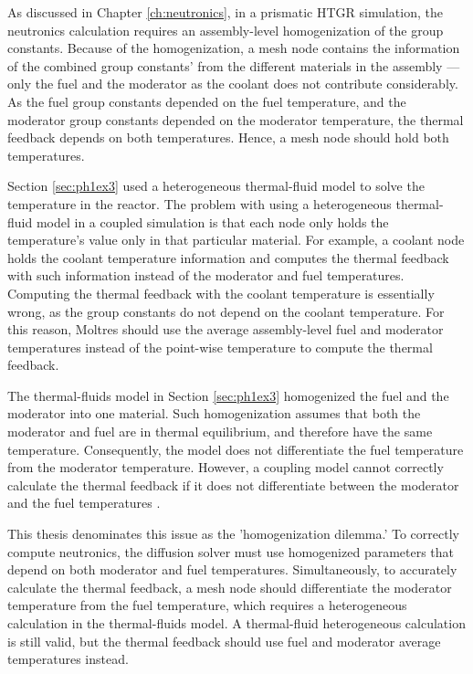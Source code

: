 As discussed in Chapter \ref{ch:neutronics}, in a prismatic HTGR simulation, the neutronics calculation requires an assembly-level homogenization of the group constants.
Because of the homogenization, a mesh node contains the information of the combined group constants' from the different materials in the assembly --- only the fuel and the moderator as the coolant does not contribute considerably.
As the fuel group constants depended on the fuel temperature, and the moderator group constants depended on the moderator temperature, the thermal feedback depends on both temperatures.
Hence, a mesh node should hold both temperatures.

Section \ref{sec:ph1ex3} used a heterogeneous thermal-fluid model to solve the temperature in the reactor.
The problem with using a heterogeneous thermal-fluid model in a coupled simulation is that each node only holds the temperature's value only in that particular material.
For example, a coolant node holds the coolant temperature information and computes the thermal feedback with such information instead of the moderator and fuel temperatures.
Computing the thermal feedback with the coolant temperature is essentially wrong, as the group constants do not depend on the coolant temperature.
For this reason, Moltres should use the average assembly-level fuel and moderator temperatures instead of the point-wise temperature to compute the thermal feedback.

The thermal-fluids model in Section \ref{sec:ph1ex3} homogenized the fuel and the moderator into one material.
Such homogenization assumes that both the moderator and fuel are in thermal equilibrium, and therefore have the same temperature.
Consequently, the model does not differentiate the fuel temperature from the moderator temperature.
However, a coupling model cannot correctly calculate the thermal feedback if it does not differentiate between the moderator and the fuel temperatures \cite{damian_vhtr_2008}.

This thesis denominates this issue as the 'homogenization dilemma.'
To correctly compute neutronics, the diffusion solver must use homogenized parameters that depend on both moderator and fuel temperatures.
Simultaneously, to accurately calculate the thermal feedback, a mesh node should differentiate the moderator temperature from the fuel temperature, which requires a heterogeneous calculation in the thermal-fluids model.
A thermal-fluid heterogeneous calculation is still valid, but the thermal feedback should use fuel and moderator average temperatures instead.

